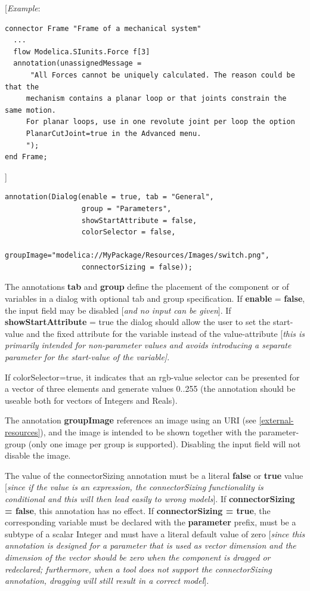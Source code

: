 \documentclass[10pt,a4paper]{report}
\begin{document}
{[}\emph{Example}:

\begin{lstlisting}[language=modelica]
connector Frame "Frame of a mechanical system"
  ...
  flow Modelica.SIunits.Force f[3]
  annotation(unassignedMessage =
      "All Forces cannot be uniquely calculated. The reason could be that the
     mechanism contains a planar loop or that joints constrain the same motion.
     For planar loops, use in one revolute joint per loop the option
     PlanarCutJoint=true in the Advanced menu.
     ");
end Frame; 
\end{lstlisting}
{]}
\begin{lstlisting}[language=modelica]
annotation(Dialog(enable = true, tab = "General",
                  group = "Parameters",
                  showStartAttribute = false,
                  colorSelector = false,
                  groupImage="modelica://MyPackage/Resources/Images/switch.png",
                  connectorSizing = false)); 
\end{lstlisting}

The annotations \textbf{tab} and \textbf{group} define the placement of
the component or of variables in a dialog with optional tab and group
specification. If \textbf{enable} = \textbf{false}, the input field may
be disabled {[}\emph{and no input can be given}{]}. If
\textbf{showStartAttribute} = true the dialog should allow the user to
set the start-value and the fixed attribute for the variable instead of
the value-attribute {[}\emph{this is primarily intended for
non-parameter values and avoids introducing a separate parameter for the
start-value of the variable{]}}.

If colorSelector=true, it indicates that an rgb-value selector can be
presented for a vector of three elements and generate values 0..255 (the
annotation should be useable both for vectors of Integers and Reals).

The annotation \textbf{groupImage} references an image using an URI (see
\ref{external-resources}), and the image is intended to be shown together with the
parameter-group (only one image per group is supported). Disabling the
input field will not disable the image.

The value of the connectorSizing annotation must be a literal
\textbf{false} or \textbf{true} value {[}\emph{since if the value is an
expression, the connectorSizing functionality is conditional and this
will then lead easily to wrong models}{]}. If \textbf{connectorSizing =
false}, this annotation has no effect. If \textbf{connectorSizing =
true}, the corresponding variable must be declared with the
\textbf{parameter} prefix, must be a subtype of a scalar Integer and
must have a literal default value of zero {[}\emph{since this annotation
is designed for a parameter that is used as vector dimension and the
dimension of the vector should be zero when the component is dragged or
redeclared; furthermore, when a tool does not support the
connectorSizing annotation, dragging will still result in a correct
model}{]}.
\end{document}
